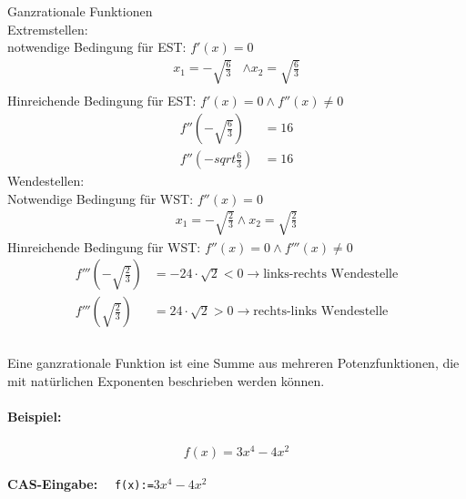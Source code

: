 \documentclass[12pt,a4paper]{report}
\newenvironment{gblock}[1]{
    \tcolorbox[beamer,
        noparskip,
        colback=green!50!,
        colbacklower=green!75!green,
        title=#1]}
{\endtcolorbox}
\newcommand{\cas}[1]{\textbf{CAS-Eingabe: }\ \ \texttt{#1}}
\begin{document}
	\noindent
	\Large
	Ganzrationale Funktionen \\
	\large
	\newpage
	\noindent
	Extremstellen: \\
	notwendige Bedingung für EST: $f'(x) = 0$ \\
	\begin{align*}
		x_1 = -\sqrt{\frac{6}{3}} &\land x_2 = \sqrt{\frac{6}{3}} \\
	\end{align*}
	Hinreichende Bedingung für EST: $f'(x) = 0 \land f''(x) \ne 0$
	\begin{align*}
		f''(-\sqrt{\frac{6}{3}}) &= 16 \\
		f''(-sqrt{\frac{6}{3}}) &= 16
	\end{align*}
	Wendestellen: \\
	Notwendige Bedingung für WST: $f''(x)=0$ \\
	\begin{align*}
		x_1 = -\sqrt{\frac{2}{3}} \land x_2 = \sqrt{\frac{2}{3}}
	\end{align*}
	Hinreichende Bedingung für WST: $f''(x) = 0 \land f'''(x) \ne 0$ \\
	\begin{align*}
		f'''(-\sqrt{\frac{2}{3}}) &= -24 \cdot \sqrt{2} < 0 \to \text{links-rechts Wendestelle} \\
		f'''(\sqrt{\frac{2}{3}}) &= 24 \cdot \sqrt{2} > 0 \to \text{rechts-links Wendestelle} \\
	\end{align*}
	\\
	\begin{gblock}{Übersicht}
		Eine ganzrationale Funktion ist eine Summe aus mehreren Potenzfunktionen, die mit natürlichen Exponenten beschrieben werden können.
		\paragraph{Beispiel:} \mbox{}
		\begin{align*}
			f(x) = 3x^4 - 4x^2
		\end{align*}
		\begin{center}
		\end{center}
		\cas{f(x):=$3x^4 - 4x^2$}
	\end{gblock}
	
\end{document}
